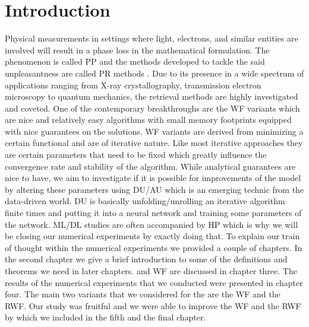 \chapter{Introduction}

Physical measurements in settings where light, electrons, and similar entities are involved will result in a phase 
loss\cite{Shechtman2015} in the mathematical formulation. The phenomenon is called \acl*{PP}\cite{Shechtman2015} 
and the methods developed to tackle the said unpleasantness are called 
\acl*{PR} methods \cite{Jaganathan2015}\cite{Liu2019}. Due to its presence in a wide spectrum of 
applications\cite{Shechtman2015}\cite{Candes2014} ranging from X-ray crystallography, transmission electron microscopy 
to quantum mechanics, the retrieval methods are highly investigated and coveted. 
One of the contemporary breakthroughs are the \ac{WF}\cite{Candes2014} variants\cite{Liu2019} which are nice and relatively easy algorithms 
with small memory footprints equipped with nice guarantees on the solutions. \ac{WF} variants \cite{Liu2019} are derived 
from minimizing a certain functional and are of iterative nature. Like most iterative approaches they are certain parameters 
that need to be fixed which greatly influence the convergence rate and stability of the algorithm. While analytical guarantees 
are nice to have, we aim to investigate if it is possible for improvements of the model by altering these parameters using \ac{DU}/\ac{AU}\cite{Monga2019}\index{\du}\index{\au} 
which is an emerging technic from the data-driven world. \ac{DU}\index{\du} is basically unfolding/unrolling an 
iterative algorithm finite times and putting it into a neural network and training some parameters of the network. \ac{ML}/\ac{DL} studies are often accompanied 
by \ac{HP}\cite{Hutter2019}\cite{Akiba2019} which is why we will be closing our numerical experiments by exactly doing that. 
To explain our train of thought within the numerical experiments we provided a couple of chapters. In the 
second chapter we give a brief introduction to some of the definitions and theorems we need in later 
chapters. \DU and \ac{WF} are discussed in chapter three. The results of the numerical experiments that we conducted 
were presented in chapter four. The main two variants that we considered for the \du are the \ac{WF} and the \ac{RWF}. Our 
study was fruitful and we were able to improve the \ac{WF} and the \ac{RWF} by \du which we included in the fifth and the final chapter.